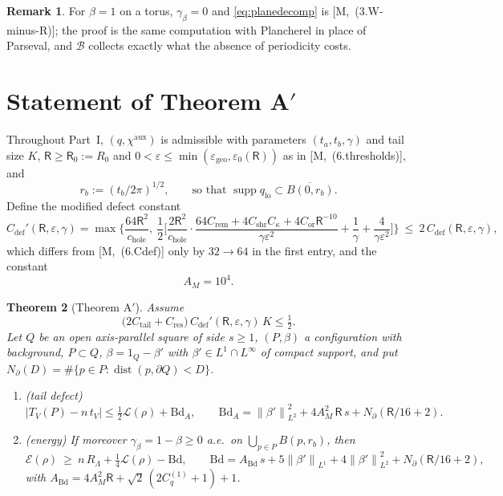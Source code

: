 \documentclass[11pt,reqno]{amsart}
\numberwithin{equation}{section}
\theoremstyle{plain}
\newtheorem{theorem}{Theorem}[section]
\theoremstyle{definition}
\newtheorem{remark}[theorem]{Remark}
\newcommand{\Lam}{\Lambda}
\newcommand{\dist}{\operatorname{dist}}
\newcommand{\supp}{\operatorname{supp}}
\newcommand{\lo}{\mathrm{lo}}
\newcommand{\norm}[1]{\left\|#1\right\|}
\newcommand{\Cc}[1]{C_{\mathrm{#1}}}
\newcommand{\cL}{\mathcal{L}}
\newcommand{\cE}{\mathcal{E}}
\newcommand{\cB}{\mathcal{B}}
\newcommand{\fR}{\mathsf{R}}
\newcommand{\Bd}{\mathrm{Bd}}
\newcommand{\ms}[1]{\textup{[M,~#1]}}
\begin{document}
\begin{remark}
For $\beta=1$ on a torus, $\gamma_\beta=0$ and \eqref{eq:planedecomp} is \ms{(3.W-minus-R)}; the proof is the same computation with Plancherel in place of Parseval, and $\cB$ collects exactly what the absence of periodicity costs.
\end{remark}

\section{Statement of Theorem A$'$}\label{sec:Aprime}

Throughout Part~I, $(q,\chi^{\mathrm{aux}})$ is admissible with parameters $(t_a,t_b,\gamma)$ and tail size $K$, $\fR\ge\fR_0:=R_0$ and $0<\varepsilon\le\min(\varepsilon_{\mathrm{geo}},\varepsilon_0(\fR))$ as in \ms{(6.thresholds)}, and
\begin{equation}\label{eq:rb}
r_b:=(t_b/2\pi)^{1/2},\qquad\text{so that }\supp q_\lo\subset\overline{B(0,r_b)} .
\end{equation}
Define the modified defect constant
\begin{equation}\label{eq:Cdefprime}
\Cc{def}'(\fR,\varepsilon,\gamma)=\max\Big\{\frac{64\fR^2}{c_{\mathrm{hole}}},\ \frac12\Big[\frac{2\fR^2}{c_{\mathrm{hole}}}\cdot\frac{64\Cc{rem}+4\Cc{shr}C_\kappa+4\Cc{or}\fR^{-10}}{\gamma\varepsilon^2}+\frac1\gamma+\frac{4}{\gamma\varepsilon^2}\Big]\Big\}\ \le\ 2\,\Cc{def}(\fR,\varepsilon,\gamma),
\end{equation}
which differs from \ms{(6.Cdef)} only by $32\to64$ in the first entry, and the constant
\begin{equation}\label{eq:AM}
A_M=10^4 .
\end{equation}

\begin{theorem}[Theorem A$'$]\label{thm:Aprime}
Assume
\begin{equation}\label{eq:hypA}
\big(2\Cc{tail}+\Cc{res}\big)\,\Cc{def}'(\fR,\varepsilon,\gamma)\,K\le\tfrac12 .
\end{equation}
Let $Q$ be an open axis-parallel square of side $s\ge1$, $(P,\beta)$ a configuration with background, $P\subset Q$, $\beta=1_Q-\beta'$ with $\beta'\in L^1\cap L^\infty$ of compact support, and put $N_\partial(D)=\#\{p\in P:\dist(p,\partial Q)<D\}$.
\begin{enumerate}[label=\textup{(\roman*)}]
\item \textup{(tail defect)}
\[
\big|T_V(P)-n\,t_V\big|\le\tfrac12\cL(\rho)+\Bd_A,\qquad\Bd_A=\norm{\beta'}_{L^2}^2+4A_M^2\,\fR\,s+N_\partial(\fR/16+2).
\]
\item \textup{(energy)} If moreover $\gamma_\beta=1-\beta\ge0$ a.e.\ on $\bigcup_{p\in P}B(p,r_b)$, then
\[
\cE(\rho)\ \ge\ n\,R_\Lam+\tfrac14\cL(\rho)-\Bd,\qquad\Bd=A_\Bd\,s+5\norm{\beta'}_{L^1}+4\norm{\beta'}_{L^2}^2+N_\partial(\fR/16+2),
\]
with $A_\Bd=4A_M^2\fR+\sqrt2\,(2C^{(1)}_q+1)+1$.
\end{enumerate}
\end{theorem}
\end{document}
